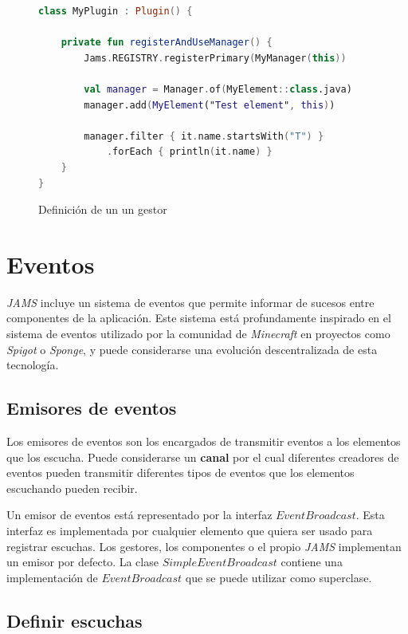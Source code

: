 \begin{figure}[h]
    \centering
    \begin{lstlisting}[frame=single,label={lst:manager-use},language=Kotlin]
class MyPlugin : Plugin() {

    private fun registerAndUseManager() {
        Jams.REGISTRY.registerPrimary(MyManager(this))

        val manager = Manager.of(MyElement::class.java)
        manager.add(MyElement("Test element", this))

        manager.filter { it.name.startsWith("T") }
            .forEach { println(it.name) }
    }
}
    \end{lstlisting}
    \caption{Definición de un un gestor}
    \label{fig:manager-use}
\end{figure}


\section{Eventos}\label{sec:eventos}

\textit{JAMS} incluye un sistema de eventos que permite informar
de sucesos entre componentes de la aplicación.
Este sistema está profundamente inspirado en el sistema de eventos
utilizado por la comunidad de \textit{Minecraft}
en proyectos como \textit{Spigot}\cite{SPIGOT}
o \textit{Sponge}\cite{SPONGE}, y puede considerarse una evolución descentralizada
de esta tecnología.

\subsection{Emisores de eventos}\label{subsec:emisores-de-eventos}

Los emisores de eventos son los encargados de transmitir
eventos a los elementos que los escucha.
Puede considerarse un \textbf{canal} por el cual diferentes creadores
de eventos pueden transmitir diferentes tipos de eventos
que los elementos escuchando pueden recibir.

\noindent Un emisor de eventos está representado por la interfaz $EventBroadcast$.
Esta interfaz es implementada por cualquier elemento que quiera ser
usado para registrar escuchas.
Los gestores, los componentes o el propio \textit{JAMS} implementan
un emisor por defecto.
La clase $SimpleEventBroadcast$ contiene una implementación de $EventBroadcast$
que se puede utilizar como superclase.

\subsection{Definir escuchas}\label{subsec:definir-escuchas}

